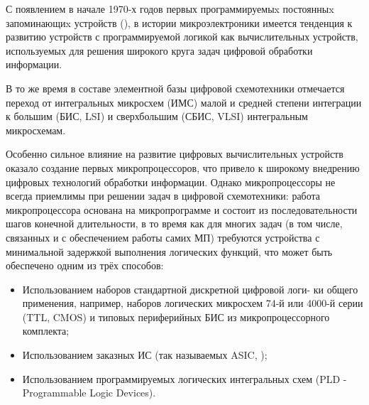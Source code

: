 %
%
%
%
{

\pagestyle{framedcontent}
\pagebreak
{}
С появлением в начале 1970-х годов первых программируемыx
постоянныx запоминающиx устройств (), в истории микроэлектроники имеется тенденция к
развитию устройств с программируемой логикой как вычислительных
устройств, используемых для решения широкого круга задач цифровой
обработки информации.

В то же время в составе элементной базы цифровой схемотехники
отмечается переход от интегральных микросхем (ИМС) малой и средней
степени интеграции к большим (БИС, LSI) и сверхбольшим (СБИС, VLSI)
интегральным микросхемам.

Особенно сильное влияние на развитие цифровых вычислительных
устройств оказало создание первых микропроцессоров, что привело
к широкому внедрению цифровых технологий обработки информации.
Однако микропроцессоры не всегда приемлимы при решении задач в
цифровой схемотехники: работа микропроцессора основана на микропрограмме
и состоит из последовательности шагов конечной длительности, в то время
как для многих задач (в том числе, связанных и с обеспечением работы
самих МП) требуются устройства с минимальной задержкой выполнения
логических функций, что может быть обеспечено одним из трёх способов:

\begin{itemize}
\item Использованием наборов стандартной дискретной цифровой логи-
ки общего применения, например, наборов логических микросхем
74-й или 4000-й серии (TTL, CMOS) и типовых периферийных БИС из микропроцессорного комплекта;
\item Использованием заказных ИС (так называемых ASIC, );
\item Использованием программируемых логических интегральных схем (PLD - Programmable Logic Devices).
\end{itemize}

\pagebreak
}
